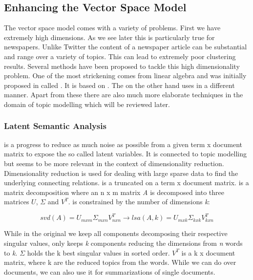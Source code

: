   \subsection{Enhancing the Vector Space Model}
  \label{sec:evsm}

    The vector space model comes with a variety of problems. First we have extremely high dimensions. As we see later this is particularly true for newspapers. Unlike Twitter the content of a newspaper article can be substantial and range over a variety of topics. This can lead to extremely poor clustering results. Several methods have been proposed to tackle this high dimensionality problem. One of the most strickening comes from linear algebra and was initially proposed in \cite{DeerwesterLSI1990} called \lsafull{}. It is based on \svdfull{}. The \pcafull{} on the other hand uses \svd{} in a different manner. Apart from these there are also much more elaborate techniques in the domain of topic modelling which will be reviewed later.

    \subsubsection{Latent Semantic Analysis}
    \label{sec:lsa}
      \lsalong{} is a progress to reduce as much noise as possible from a given term x document matrix to expose the so called latent variables. It is connected to topic modelling but seems to be more relevant in the context of dimensionality reduction. Dimensionality reduction is used for dealing with large sparse data to find the underlying connecting relations. \lsa{} is a truncated \svdfull{} on a term x document matrix. \svd{} is a matrix decomposition where an n x m matrix \emph{A} is decomposed into three matrices $U$, $\Sigma$ and $V^{T}$. \lsa{} is constrained by the number of dimensions \emph{k}:

      \begin{equation}
        svd(A) = U_{mxm}\Sigma_{mxn} V^{T}_{nxn} \to lsa(A, k) = U_{mxk}\Sigma_{kxk} V^{T}_{kxn}
      \end{equation}

      While in the original \svd{} we keep all components decomposing their respective singular values, \lsa{} only keeps \emph{k} components reducing the dimensions from \emph{n} words to \emph{k}. $\Sigma$ holds the k best singular values in sorted order. $V^{T}$ is a k x document matrix, where k are the reduced topics from the words. While we can do \lsa{} over documents, we can also use it for summarizations of single documents.

